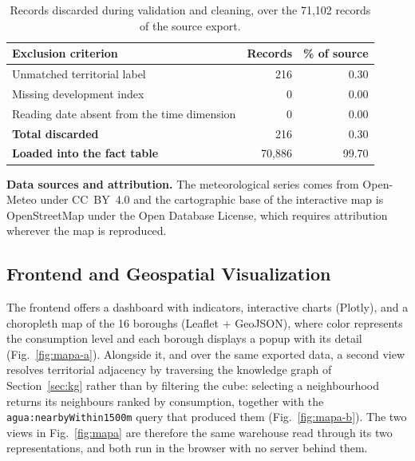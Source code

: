 \documentclass[runningheads]{llncs}
\newif\ifmarcarcambios
\newcommand{\icokg}[1]{\ifmarcarcambios\textcolor{nuevo}{#1}\else#1\fi}
\newenvironment{icokgblock}{\ifmarcarcambios\color{nuevo}\fi}{}
\renewcommand{\_}{\origunderscore\allowbreak}
\begin{document}
\begin{icokgblock}
\begin{table}[tbp]
\centering
\caption{Records discarded during validation and cleaning, over the 71,102
records of the source export.}
\label{tab:cleaning}
\begin{tabular}{lrr}
\hline
\textbf{Exclusion criterion} & \textbf{Records} & \textbf{\% of source} \\
\hline
Unmatched territorial label                 &    216 &  0.30 \\
Missing development index                   &      0 &  0.00 \\
Reading date absent from the time dimension &      0 &  0.00 \\
\hline
\textbf{Total discarded}                    &    216 &  0.30 \\
\textbf{Loaded into the fact table}         & 70,886 & 99.70 \\
\hline
\end{tabular}
\end{table}

\noindent\textbf{Data sources and attribution.} The meteorological series comes
from Open-Meteo under CC~BY~4.0 and the cartographic base of the interactive map
is OpenStreetMap under the Open Database License, which requires attribution
wherever the map is reproduced.
\end{icokgblock}

\subsection{Frontend and Geospatial Visualization}

The frontend offers a dashboard with indicators, interactive charts (Plotly), and
a choropleth map of the 16 boroughs (Leaflet + GeoJSON), where color represents
the consumption level and each borough displays a popup with its detail
(Fig.~\ref{fig:mapa-a}). \icokg{Alongside it, and over the same exported data, a
second view resolves territorial adjacency by traversing the knowledge graph of
Section~\ref{sec:kg} rather than by filtering the cube: selecting a neighbourhood
returns its neighbours ranked by consumption, together with the
\icokg{\texttt{agua:nearbyWithin1500m}} query that produced them (Fig.~\ref{fig:mapa-b}). The two
views in Fig.~\ref{fig:mapa} are therefore the same warehouse read through its
two representations, and both run in the browser with no server behind them.}
\end{document}
